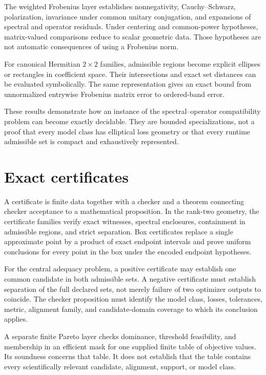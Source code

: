The weighted Frobenius layer establishes nonnegativity, Cauchy--Schwarz, polarization,
invariance under common unitary conjugation, and expansions of spectral and operator
residuals.  Under centering and common-power hypotheses, matrix-valued comparisons
reduce to scalar geometric data.  Those hypotheses are not automatic consequences of
using a Frobenius norm.

For canonical Hermitian $2\times2$ families, admissible regions become explicit ellipses
or rectangles in coefficient space.  Their intersections and exact set distances can
be evaluated symbolically.  The same representation gives an exact bound from
unnormalized entrywise Frobenius matrix error to ordered-band error.

These results demonstrate how an instance of the spectral--operator compatibility
problem can become exactly decidable.  They are bounded specializations, not a proof
that every model class has elliptical loss geometry or that every runtime admissible
set is compact and exhaustively represented.

\section{Exact certificates}

A certificate is finite data together with a checker and a theorem connecting checker
acceptance to a mathematical proposition.  In the rank-two geometry, the certificate
families verify exact witnesses, spectral enclosures, containment in admissible regions,
and strict separation.  Box certificates replace a single approximate point by a
product of exact endpoint intervals and prove uniform conclusions for every point in
the box under the encoded endpoint hypotheses.

For the central adequacy problem, a positive certificate may establish one common
candidate in both admissible sets.  A negative certificate must establish separation of
the full declared sets, not merely failure of two optimizer outputs to coincide.  The
checker proposition must identify the model class, losses, tolerances, metric,
alignment family, and candidate-domain coverage to which its conclusion applies.

A separate finite Pareto layer checks dominance, threshold feasibility, and membership
in an efficient mask for one supplied finite table of objective values.  Its soundness
concerns that table.  It does not establish that the table contains every scientifically
relevant candidate, alignment, support, or model class.


